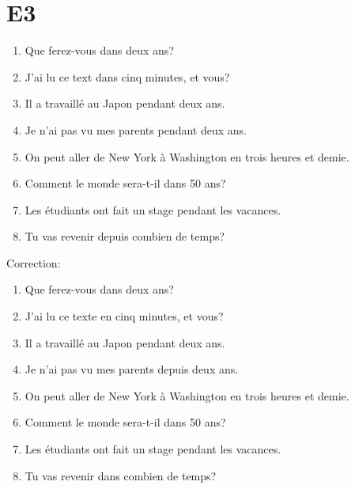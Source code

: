 \documentclass{book}
\begin{document}
    \section{E3}
        \begin{enumerate}
            \item Que ferez-vous dans deux ans?
            \item J'ai lu ce text dans cinq minutes, et vous?
            \item Il a travaillé au Japon pendant deux ans.
            \item Je n'ai pas vu mes parents pendant deux ans.
            \item On peut aller de New York à Washington en trois heures et demie.
            \item Comment le monde sera-t-il dans 50 ans?
            \item Les étudiants ont fait un stage pendant les vacances.
            \item Tu vas revenir depuis combien de temps?
        \end{enumerate}
        Correction:
        \begin{enumerate}
            \item Que ferez-vous dans deux ans?
            \item J'ai lu ce texte en cinq minutes, et vous?
            \item Il a travaillé au Japon pendant deux ans.
            \item Je n'ai pas vu mes parents depuis deux ans.
            \item On peut aller de New York à Washington en trois heures et demie.
            \item Comment le monde sera-t-il dans 50 ans?
            \item Les étudiants ont fait un stage pendant les vacances.
            \item Tu vas revenir dans combien de temps?
        \end{enumerate}
    
\end{document}
